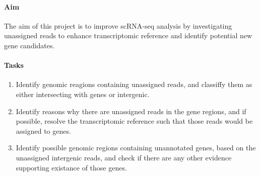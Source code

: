 \paragraph{\textbf{Aim}}

The aim of this project is to improve scRNA-seq analysis
by investigating unassigned reads to enhance transcriptomic reference and identify potential new gene candidates.

\paragraph{\textbf{Tasks}}

\begin{enumerate}
  \item Identify genomic reagions containing unassigned reads, and classiffy them as either intersecting with genes or intergenic.
  \item Identify reasons why there are unassigned reads in the gene regions, and if possible,
  resolve the transcriptomic reference such that those reads would be assigned to genes.
  \item Identify possible genomic regions containing unannotated genes, based on the unassigned intergenic reads,
  and check if there are any other evidence supporting existance of those genes.
\end{enumerate}
